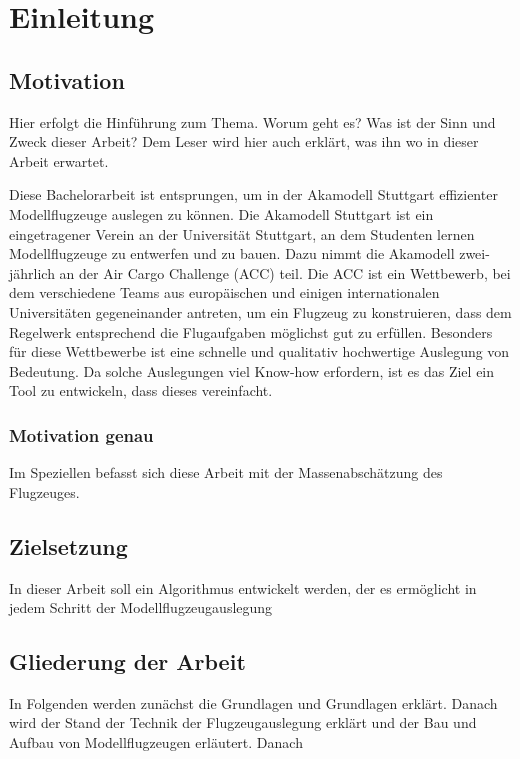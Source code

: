 \chapter{Einleitung}					%
\label{chap:einleitung}					%

\section{Motivation}					%
\label{sec:motivation}
Hier erfolgt die Hinführung zum Thema. Worum geht es? Was ist der Sinn und Zweck dieser Arbeit? Dem Leser wird hier auch erklärt, was ihn wo in dieser Arbeit erwartet.

Diese Bachelorarbeit ist entsprungen, um in der Akamodell Stuttgart effizienter Modellflugzeuge auslegen zu können. Die Akamodell Stuttgart ist ein eingetragener Verein an der Universität Stuttgart, an dem Studenten lernen Modellflugzeuge zu entwerfen und zu bauen. Dazu nimmt die Akamodell zwei-jährlich an der Air Cargo Challenge (ACC) teil. Die ACC ist ein Wettbewerb, bei dem verschiedene Teams aus europäischen und einigen internationalen Universitäten gegeneinander antreten, um ein Flugzeug zu konstruieren, dass dem Regelwerk entsprechend die Flugaufgaben möglichst gut zu erfüllen. Besonders für diese Wettbewerbe ist eine schnelle und qualitativ hochwertige Auslegung von Bedeutung. Da solche Auslegungen viel Know-how erfordern, ist es das Ziel ein Tool zu entwickeln, dass dieses vereinfacht.

\subsection{Motivation genau}			%
\label{subsec:motgenau}

Im Speziellen befasst sich diese Arbeit mit der Massenabschätzung des Flugzeuges.

\section{Zielsetzung}
\label{sec:zielsetzung}
In dieser Arbeit soll ein Algorithmus entwickelt werden, der es ermöglicht  in jedem Schritt der Modellflugzeugauslegung 

\section{Gliederung der Arbeit}
\label{sec:gliederung}
In Folgenden werden zunächst die Grundlagen und Grundlagen erklärt. Danach wird der Stand der Technik der Flugzeugauslegung erklärt und der Bau und Aufbau von Modellflugzeugen erläutert. Danach 
